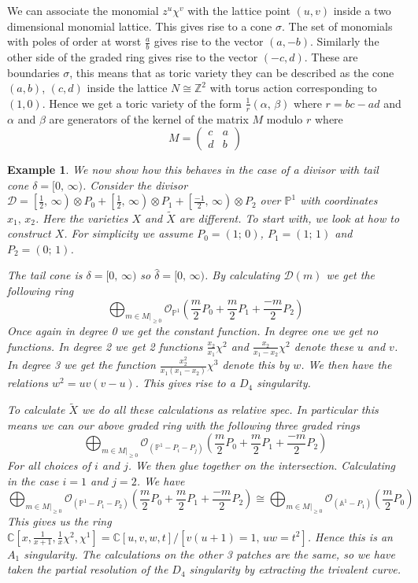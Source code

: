 \documentclass[12pt]{amsart}
\theoremstyle{plain}
\newtheorem{ex}[thm]{Example}
\newcommand{\mb}[1]{\mathbb{#1}}
\begin{document}
We can associate the monomial $z^u \chi^v$ with the lattice point $(u,v)$ inside a two dimensional monomial lattice. This gives rise to a cone $\sigma$. The set of monomials with poles of order at worst $\frac{a}{b}$ gives rise to the vector $(a, -b)$. Similarly the other side of the graded ring gives rise to the vector $(-c, d)$. These are boundaries $\sigma$, this means that as toric variety they can be described as the cone $(a,b)$, $(c,d)$ inside the lattice $N \cong \mathbb{Z}^2$ with torus action corresponding to $(1,0)$.  Hence we get a toric variety of the form $\frac{1}{r}(\alpha, \, \beta)$ where $r = bc-ad$ and $\alpha$ and $\beta$ are generators of the kernel of the matrix $M$ modulo $r$ where
\[
M = \left( \begin{array}{cc} c & a \\ d & b \end{array} \right)
\]


\begin{ex}\rm
We now show how this behaves in the case of a divisor with tail cone $\delta = [0, \, \infty)$. Consider the divisor $\mathcal{D} = \left[\frac{1}{2}, \, \infty \right) \otimes P_0 + \left[\frac{1}{2}, \, \infty \right) \otimes P_1 + \left[\frac{-1}{2}, \, \infty \right) \otimes P_2$ over $\mb{P}^1$ with coordinates $x_1, \, x_2$. Here the varieties $X$ and $\widetilde{X}$ are different. To start with, we look at how to construct $X$. For simplicity we assume $P_0 = (1; \, 0)$, $P_1 = (1; \, 1)$ and $P_2 = (0; \, 1)$.

The tail cone is $\delta = [0, \, \infty)$ so $\hat\delta = [0, \, \infty)$. By calculating $\mathcal{D}(m)$ we get the following ring
\[
\bigoplus_{m \in M|_{\geq 0}} \mathcal{O}_{\mb{P}^1} \left( \frac{m}{2} P_0 + \frac{m}{2} P_1 + \frac{-m}{2} P_2 \right)
\]
Once again in degree 0 we get the constant function. In degree one we get no functions. In degree 2 we get 2 functions $\frac{x_2}{x_1} \chi^2 $ and $\frac{x_2}{x_1-x_2} \chi^2$ denote these $u$ and $v$. In degree 3 we get the function $\frac{x_2^2}{x_1(x_1-x_2)} \chi^3 $ denote this by $w$. We then have the relations $w^2 = uv(v-u)$. This gives rise to a $D_4$ singularity.  

To calculate $\widetilde{X}$ we do all these calculations as relative spec. In particular this means we can our above graded ring with the following three graded rings
\[
\bigoplus_{m \in M|_{\geq 0}} \mathcal{O}_{(\mb{P}^1 - P_i - P_j)} \left( \frac{m}{2} P_0 + \frac{m}{2} P_1 + \frac{-m}{2} P_2 \right)
\]
For all choices of $i$ and $j$. We then glue together on the intersection. Calculating in the case $i=1$ and $j =2$. We have
\[
\bigoplus_{m \in M|_{\geq 0}} \mathcal{O}_{(\mb{P}^1 - P_1 - P_2)} \left( \frac{m}{2} P_0 + \frac{m}{2} P_1 + \frac{-m}{2} P_2 \right) \cong \bigoplus_{m \in M|_{\geq 0}} \mathcal{O}_{(\mb{A}^1 - P_1)} (\frac{m}{2}P_0)
\]
This gives us the ring $\mb{C}[x, \frac{1}{x+1}, \frac{1}{x}\chi^2, \chi^1] = \mb{C}[u,v,w,t]/[v(u+1) = 1, \, uw = t^2]$. Hence this is an $A_1$ singularity. The calculations on the other 3 patches are the same, so we have taken the partial resolution of the $D_4$ singularity by extracting the trivalent curve. 
\end{ex}
\end{document}
